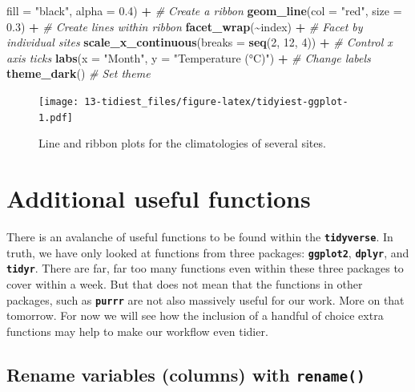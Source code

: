 \documentclass[
]{book}
\newenvironment{Shaded}{\begin{snugshade}}{\end{snugshade}}
\newcommand{\CommentTok}[1]{\textcolor[rgb]{0.56,0.35,0.01}{\textit{#1}}}
\newcommand{\DataTypeTok}[1]{\textcolor[rgb]{0.13,0.29,0.53}{#1}}
\newcommand{\DecValTok}[1]{\textcolor[rgb]{0.00,0.00,0.81}{#1}}
\newcommand{\FloatTok}[1]{\textcolor[rgb]{0.00,0.00,0.81}{#1}}
\newcommand{\KeywordTok}[1]{\textcolor[rgb]{0.13,0.29,0.53}{\textbf{#1}}}
\newcommand{\NormalTok}[1]{#1}
\newcommand{\OperatorTok}[1]{\textcolor[rgb]{0.81,0.36,0.00}{\textbf{#1}}}
\newcommand{\StringTok}[1]{\textcolor[rgb]{0.31,0.60,0.02}{#1}}
\begin{document}
\begin{Shaded}
\begin{Highlighting}[]
              \DataTypeTok{fill =} \StringTok{"black"}\NormalTok{, }\DataTypeTok{alpha =} \FloatTok{0.4}\NormalTok{) }\OperatorTok{+}\StringTok{ }\CommentTok{\# Create a ribbon}
\StringTok{  }\KeywordTok{geom\_line}\NormalTok{(}\DataTypeTok{col =} \StringTok{"red"}\NormalTok{, }\DataTypeTok{size =} \FloatTok{0.3}\NormalTok{) }\OperatorTok{+}\StringTok{ }\CommentTok{\# Create lines within ribbon}
\StringTok{  }\KeywordTok{facet\_wrap}\NormalTok{(}\OperatorTok{\textasciitilde{}}\NormalTok{index) }\OperatorTok{+}\StringTok{ }\CommentTok{\# Facet by individual sites}
\StringTok{  }\KeywordTok{scale\_x\_continuous}\NormalTok{(}\DataTypeTok{breaks =} \KeywordTok{seq}\NormalTok{(}\DecValTok{2}\NormalTok{, }\DecValTok{12}\NormalTok{, }\DecValTok{4}\NormalTok{)) }\OperatorTok{+}\StringTok{ }\CommentTok{\# Control x axis ticks}
\StringTok{  }\KeywordTok{labs}\NormalTok{(}\DataTypeTok{x =} \StringTok{"Month"}\NormalTok{, }\DataTypeTok{y =} \StringTok{"Temperature (°C)"}\NormalTok{) }\OperatorTok{+}\StringTok{ }\CommentTok{\# Change labels}
\StringTok{  }\KeywordTok{theme\_dark}\NormalTok{() }\CommentTok{\# Set theme}
\end{Highlighting}
\end{Shaded}

\begin{figure}
\centering
\texttt{[image: 13-tidiest\_files/figure-latex/tidyiest-ggplot-1.pdf]}
\caption{\label{fig:tidyiest-ggplot}Line and ribbon plots for the climatologies of several sites.}
\end{figure}

\hypertarget{additional-useful-functions}{%
\section{Additional useful functions}\label{additional-useful-functions}}

There is an avalanche of useful functions to be found within the \textbf{\texttt{tidyverse}}. In truth, we have only looked at functions from three packages: \textbf{\texttt{ggplot2}}, \textbf{\texttt{dplyr}}, and \textbf{\texttt{tidyr}}. There are far, far too many functions even within these three packages to cover within a week. But that does not mean that the functions in other packages, such as \textbf{\texttt{purrr}} are not also massively useful for our work. More on that tomorrow. For now we will see how the inclusion of a handful of choice extra functions may help to make our workflow even tidier.

\hypertarget{rename-variables-columns-with-rename}{%
\subsection{\texorpdfstring{Rename variables (columns) with \texttt{rename()}}{Rename variables (columns) with rename()}}\label{rename-variables-columns-with-rename}}
\end{document}
